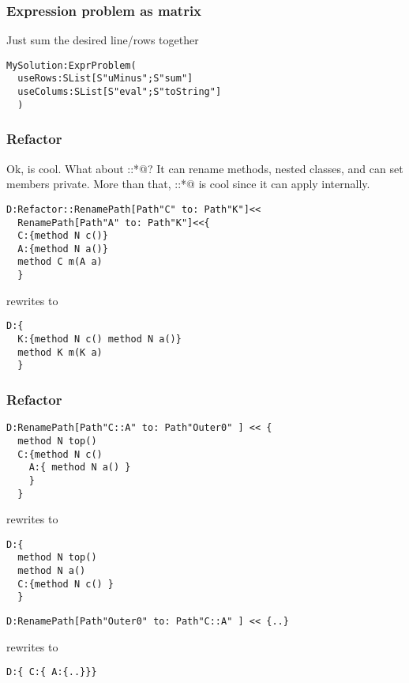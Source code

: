 \begin{frame}[fragile]
\frametitle{Expression problem as matrix}
Just sum the desired line/rows together
\begin{NiceCode}{59ex}{0.8}
\begin{lstlisting}
MySolution:ExprProblem(
  useRows:SList[S"uMinus";S"sum"]
  useColums:SList[S"eval";S"toString"]
  )
\end{lstlisting}
\end{NiceCode}




\end{frame}



\begin{frame}[fragile]
\frametitle{Refactor}
Ok, \Q@Compose@ is cool.
What about \Q@Refactor::*@?
It can rename methods, nested classes, and can set members private.
More than that, \Q@Refactor::*@ is cool since it can apply \Q@Compose@ internally.
\begin{NiceCode}{59ex}{0.8}
\begin{lstlisting}
D:Refactor::RenamePath[Path"C" to: Path"K"]<<
  RenamePath[Path"A" to: Path"K"]<<{
  C:{method N c()}
  A:{method N a()}
  method C m(A a)
  }
\end{lstlisting}
\end{NiceCode}
rewrites to 
\begin{NiceCode}{59ex}{0.8}
\begin{lstlisting}
D:{
  K:{method N c() method N a()}
  method K m(K a)
  }
\end{lstlisting}
\end{NiceCode}
\end{frame}


\begin{frame}[fragile]
\begin{NiceCode}{59ex}{0.8}
\frametitle{Refactor}
\begin{lstlisting}
D:RenamePath[Path"C::A" to: Path"Outer0" ] << {
  method N top()
  C:{method N c()
    A:{ method N a() }
    }
  }
\end{lstlisting}
\end{NiceCode}
rewrites to 
\begin{NiceCode}{59ex}{0.8}
\begin{lstlisting}
D:{
  method N top()
  method N a()
  C:{method N c() }
  }
\end{lstlisting}
\end{NiceCode}


\begin{NiceCode}{59ex}{0.8}
\begin{lstlisting}
D:RenamePath[Path"Outer0" to: Path"C::A" ] << {..}
\end{lstlisting}
\end{NiceCode}
rewrites to 
\begin{NiceCode}{59ex}{0.8}
\begin{lstlisting}
D:{ C:{ A:{..}}}
\end{lstlisting}
\end{NiceCode}

\end{frame}

